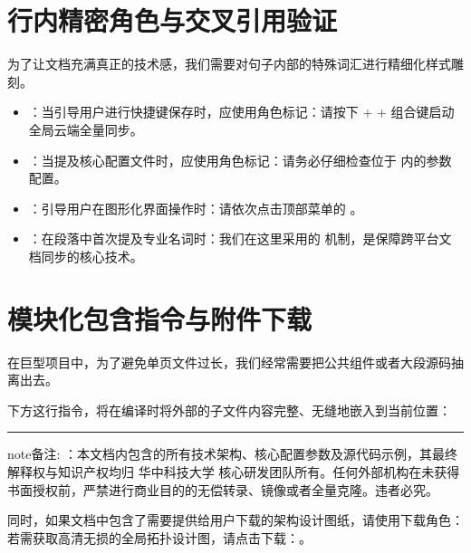 \documentclass[a4paper,11pt,english]{sphinxmanual}
\begin{document}
\section{行内精密角色与交叉引用验证}
\label{\detokenize{advanced_showcase:id6}}
\sphinxAtStartPar
为了让文档充满真正的技术感，我们需要对句子内部的特殊词汇进行精细化样式雕刻。
\begin{itemize}
\item {} 
\sphinxAtStartPar
{}：当引导用户进行快捷键保存时，应使用角色标记：请按下  \sphinxkeyboard{\sphinxupquote{}}+\sphinxkeyboard{\sphinxupquote{}}  \sphinxkeyboard{\sphinxupquote{}}+\sphinxkeyboard{\sphinxupquote{}}  组合键启动全局云端全量同步。

\item {} 
\sphinxAtStartPar
{}：当提及核心配置文件时，应使用角色标记：请务必仔细检查位于  内的参数配置。

\item {} 
\sphinxAtStartPar
{}：引导用户在图形化界面操作时：请依次点击顶部菜单的 。

\item {} 
\sphinxAtStartPar
{}：在段落中首次提及专业名词时：我们在这里采用的  机制，是保障跨平台文档同步的核心技术。

\end{itemize}


\section{模块化包含指令与附件下载}
\label{\detokenize{advanced_showcase:id7}}
\sphinxAtStartPar
在巨型项目中，为了避免单页文件过长，我们经常需要把公共组件或者大段源码抽离出去。

\sphinxAtStartPar
下方这行指令，将在编译时将外部的子文件内容完整、无缝地嵌入到当前位置：


\bigskip\hrule\bigskip


\begin{sphinxadmonition}{note}{备注:}
\sphinxAtStartPar
{}：本文档内包含的所有技术架构、核心配置参数及源代码示例，其最终解释权与知识产权均归 华中科技大学 核心研发团队所有。任何外部机构在未获得书面授权前，严禁进行商业目的的无偿转录、镜像或者全量克隆。违者必究。
\end{sphinxadmonition}

\sphinxAtStartPar
同时，如果文档中包含了需要提供给用户下载的架构设计图纸，请使用下载角色：
若需获取高清无损的全局拓扑设计图，请点击下载：。



\renewcommand{\indexname}{索引}
\printindex
\end{document}
